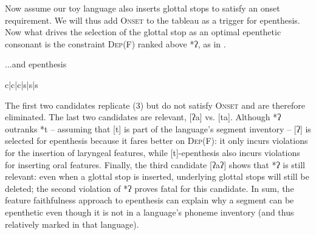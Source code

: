 \documentclass[output=paper,colorlinks,citecolor=brown]{langscibook}
\begin{document}
Now assume our toy language also inserts glottal stops to satisfy an onset requirement. We will thus add \textsc{Onset} to the tableau as a trigger for epenthesis. Now what drives the selection of the glottal stop as an optimal epenthetic consonant is the constraint \textsc{Dep(F)} ranked above *ʔ, as in .


\begin{table}
\caption{...and epenthesis}
\label{tableau2:tbl1}
\ShadingOn
\begin{tableau}{c|c|c|s|s|s} 
          
\cand{[aʔ]}                \vio{*!}  \vio{} \vio{*}                                           \vio{} \vio{}  \vio{} 
\cand{[a]}                          \vio{*!}  \vio{} \vio{}                                           \vio{*} \vio{}  \vio{}  
\cand{[ʔaʔ]}    \vio{}   \vio{**!}                                       \vio{} \vio{*}  \vio{}
\cand[\Optimal]{[ʔa]}     \vio{}   \vio{*}                                           \vio{*} \vio{*}  \vio{}
\cand{[ta]}                         \vio{}                                      \vio{} \vio{*} \vio{*}  \vio{*}
\end{tableau}
\end{table}


The first two candidates replicate (3) but do not satisfy \textsc{Onset} and are therefore eliminated. The last two candidates are relevant, [ʔa] vs. [ta]. Although *ʔ outranks *t -- assuming that [t] is part of the language's segment inventory -- [ʔ] is selected for epenthesis because it fares better on \textsc{Dep}(F): it only incurs violations for the insertion of laryngeal features, while [t]-epenthesis also incurs violations for inserting oral features. Finally, the third candidate [ʔaʔ] shows that *ʔ is still relevant: even when a glottal stop is inserted, underlying glottal stops will still be deleted; the second violation of *ʔ proves fatal for this candidate. In sum, the feature faithfulness approach to epenthesis can explain why a segment can be epenthetic even though it is not in a language's phoneme inventory (and thus relatively marked in that language).
\end{document}
